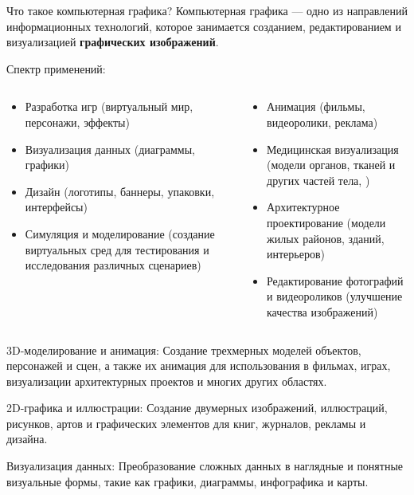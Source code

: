 \documentclass{beamer}
\begin{document}
	\begin{frame}{Что такое компьютерная графика?}
		Компьютерная графика --- одно из направлений информационных технологий, которое занимается созданием, редактированием и визуализацией \textbf{графических изображений}.
		
		Спектр применений:
		
		\begin{columns}
			
			\begin{column}{0.5\textwidth}
				\begin{itemize}
				\item
				Разработка игр (виртуальный мир, персонажи, эффекты)
				
				\item
				Визуализация данных (диаграммы, графики)
				\item
				Дизайн (логотипы, баннеры, упаковки, интерфейсы)
				\item
				Симуляция и моделирование (создание виртуальных сред для тестирования и исследования различных сценариев)
				
			\end{itemize}
			\end{column}
			\begin{column}{0.5\textwidth}
				\begin{itemize}
				\item
				Анимация (фильмы, видеоролики, реклама)
				\item
				Медицинская визуализация (модели органов, тканей и других частей тела, )
				\item
				Архитектурное проектирование (модели жилых районов, зданий, интерьеров)
				\item
				Редактирование фотографий и видеороликов (улучшение качества изображений)
			\end{itemize}
			\end{column}
		
		\end{columns}
		
		
		3D-моделирование и анимация: Создание трехмерных моделей объектов, персонажей и сцен, а также их анимация для использования в фильмах, играх, визуализации архитектурных проектов и многих других областях.
		
		2D-графика и иллюстрации: Создание двумерных изображений, иллюстраций, рисунков, артов и графических элементов для книг, журналов, рекламы и дизайна.
		
		Визуализация данных: Преобразование сложных данных в наглядные и понятные визуальные формы, такие как графики, диаграммы, инфографика и карты.
		

\end{frame}
\end{document}
